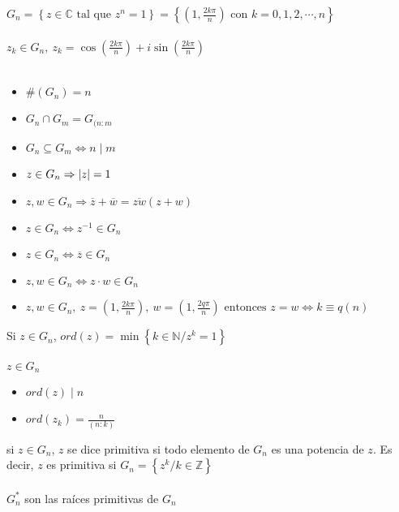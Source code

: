 \documentclass[a4paper,10pt]{article}
\begin{document}
 $G_n = \left\lbrace z \in \mathbb{C} \mbox{ tal que } z^{n}=1 \right\rbrace = \left\lbrace (1,\frac{2k\pi} {n}) \mbox{ con } k = 0,1,2,\cdots,n \right\rbrace$ \\ \\

\notacion $z_k \in G_n, \ z_k = \cos (\frac{2k\pi}{n}) + i\sin (\frac{2k\pi}{n})$ \\ \\

\propiedades 
\begin{itemize}
	\item $\#(G_n) = n$
	\item $G_{n} \cap G_{m} = G_{(n:m}$
	\item $G_{n} \subseteq G_{m} \Leftrightarrow n \mid m$ 
	\item $z \in G_n \Rightarrow \left\lvert z\right\rvert = 1$
	\item $z,w \in G_n \Rightarrow \overline{z}+\overline{w}=\overline{zw}(z+w)$
	\item $z \in G_n \Leftrightarrow z^{-1} \in G_n$
	\item $z \in G_n \Leftrightarrow \overline{z} \in G_n$
	\item $z,w \in G_n \Leftrightarrow z \cdot w \in G_n$
	\item $z,w \in G_n, \ z=(1,\frac{2k\pi}{n}), \ w=(1,\frac{2q\pi}{n}) \mbox{ entonces } z=w \Leftrightarrow k \equiv q (n)$
\end{itemize}

 Si $z \in G_n$, $ord(z)=\min \left\lbrace k \in \mathbb{N} / z^{k}=1 \right\rbrace$ \\ \\

\propiedades $z \in G_n$
\begin{itemize}
	\item $ord(z) \mid n$
	\item $ord(z_k) = \frac{n}{(n:k)}$
\end{itemize}

 si $z \in G_n$, $z$ se dice primitiva si todo elemento de $G_n$ es una potencia de $z$. Es decir, $z$ es primitiva si $G_n = \left\lbrace z^{k} / k \in \mathbb{Z} \right\rbrace$ \\ \\

\notacion $G_{n}^{*}$ son las raíces primitivas de $G_n$ \\ \\
\end{document}
